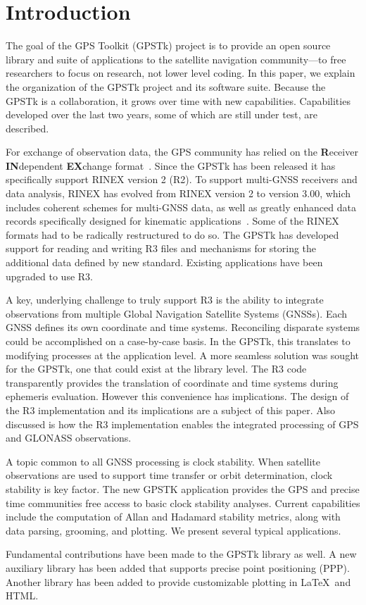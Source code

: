 \section*{Introduction}

The goal of the GPS Toolkit (GPSTk) project is to provide an open
source library and suite of applications to the satellite navigation
community---to free researchers to focus on research, not lower level
coding. In this paper, we explain the organization of the GPSTk project
and its software suite. Because the GPSTk is a collaboration, it grows
over time with new capabilities. Capabilities developed over the last
two years, some of which are still under test, are described.

For exchange of observation data, the GPS community has relied on the
{\bf R}eceiver {\bf IN}dependent {\bf EX}change
format~\cite{rinex1format,rinex2format,rinex211format}.  Since the
GPSTk has been released it has specifically support RINEX version 2
(R2).  To support multi-GNSS receivers and data analysis, RINEX has
evolved from RINEX version 2 to version 3.00, which includes coherent
schemes for multi-GNSS data, as well as greatly enhanced data records
specifically designed for kinematic
applications~\cite{rinex300format}.  Some of the RINEX formats had to
be radically restructured to do so. The GPSTk has developed support
for reading and writing R3 files and mechanisms for storing the
additional data defined by new standard. Existing applications have
been upgraded to use R3.

A key, underlying challenge to truly support R3 is the ability to
integrate observations from multiple Global Navigation Satellite
Systems (GNSSs). Each GNSS defines its own coordinate and time
systems. Reconciling disparate systems could be accomplished on a
case-by-case basis. In the GPSTk, this translates to modifying
processes at the application level. A more seamless solution was
sought for the GPSTk, one that could exist at the library level. The
R3 code transparently provides the translation of coordinate and time
systems during ephemeris evaluation. However this convenience has
implications. The design of the R3 implementation and its implications
are a subject of this paper. Also discussed is how the R3 implementation 
enables the integrated processing of GPS and GLONASS observations.

A topic common to all GNSS processing is clock stability. 
When satellite observations  are used to support time transfer or
orbit determination, clock stability is key factor. The new
GPSTK application  provides the GPS and precise time
communities free access to basic clock stability analyses. Current
 capabilities include the computation of Allan and Hadamard
stability metrics, along with data parsing, grooming, and plotting. We
present several typical applications.

Fundamental contributions have been made to the \mbox{GPSTk} library as well.
A new auxiliary library has been added that supports precise point
positioning (PPP). Another library has been added to provide customizable
plotting in \LaTeX\ and HTML. 

